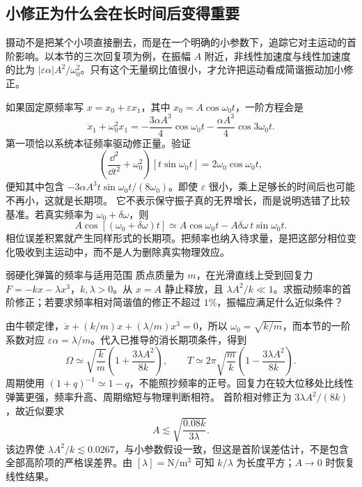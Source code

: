 \subsection{小修正为什么会在长时间后变得重要}
摄动不是把某个小项直接删去，而是在一个明确的小参数下，追踪它对主运动的首阶影响。以本节的三次回复项为例，在振幅 $A$ 附近，非线性加速度与线性加速度的比为 $|\varepsilon\alpha|A^2/\omega_0^2$。只有这个无量纲比值很小，才允许把运动看成简谐振动加小修正。

如果固定原频率写 $x=x_0+\varepsilon x_1$，其中 $x_0=A\cos\omega_0t$，一阶方程会是
\[
 \ddot x_1+\omega_0^2x_1
 =-\frac{3\alpha A^3}{4}\cos\omega_0t
  -\frac{\alpha A^3}{4}\cos3\omega_0t.
\]
第一项恰以系统本征频率驱动修正量。验证
\[
 \left(\frac{\dd^2}{\dd t^2}+\omega_0^2\right)
 [t\sin\omega_0t]=2\omega_0\cos\omega_0t,
\]
便知其中包含 $-3\alpha A^3t\sin\omega_0t/(8\omega_0)$。即使 $\varepsilon$ 很小，乘上足够长的时间后也可能不再小，这就是长期项。
它不表示保守振子真的无界增长，而是说明选错了比较基准。若真实频率为 $\omega_0+\delta\omega$，则
\[
 A\cos[(\omega_0+\delta\omega)t]
 \simeq A\cos\omega_0t-A\delta\omega\,t\sin\omega_0t.
\]
相位误差积累就产生同样形式的长期项。把频率也纳入待求量，是把这部分相位变化吸收到主运动中，而不是人为删除真实物理效应。

\begin{origexamplebox}{弱硬化弹簧的频率与适用范围}\label{ch10:ex:teaching-hardening}
质点质量为 $m$，在光滑直线上受到回复力 $F=-kx-\lambda x^3$，$k,\lambda>0$。从 $x=A$ 静止释放，且 $\lambda A^2/k\ll1$。求振动频率的首阶修正；若要求频率相对简谐值的修正不超过 $1\%$，振幅应满足什么近似条件？
\end{origexamplebox}
\begin{xesolution}
由牛顿定律，$\ddot x+(k/m)x+(\lambda/m)x^3=0$，所以 $\omega_0=\sqrt{k/m}$，而本节的一阶系数对应 $\varepsilon\alpha=\lambda/m$。代入已推导的消长期项条件，得到
\[
 \Omega\simeq\sqrt{\frac km}\left(1+\frac{3\lambda A^2}{8k}\right),
 \qquad T\simeq2\pi\sqrt{\frac mk}\left(1-\frac{3\lambda A^2}{8k}\right).
\]
周期使用 $(1+q)^{-1}\simeq1-q$，不能照抄频率的正号。回复力在较大位移处比线性弹簧更强，频率升高、周期缩短与物理判断相符。
首阶相对修正为 $3\lambda A^2/(8k)$，故近似要求
\[
 A\lesssim\sqrt{\frac{0.08k}{3\lambda}}.
\]
该边界使 $\lambda A^2/k\lesssim0.0267$，与小参数假设一致，但这是首阶误差估计，不是包含全部高阶项的严格误差界。由 $[\lambda]=\mathrm{N/m^3}$ 可知 $k/\lambda$ 为长度平方；$A\to0$ 时恢复线性结果。
\end{xesolution}

